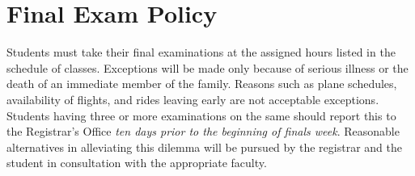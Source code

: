 \section{Final Exam Policy}

Students must take their final examinations at the assigned hours
listed in the schedule of classes.
Exceptions will be made only because of serious illness
or the death of an immediate member of the family.
Reasons such as
plane schedules,
availability of flights,
and rides leaving early
are not acceptable exceptions.
Students having three or more examinations on the same
should report this to the Registrar's Office
\emph{ten days prior to the beginning of finals week}.
Reasonable alternatives in alleviating this dilemma
will be pursued by the registrar
and the student in consultation with the appropriate faculty.
